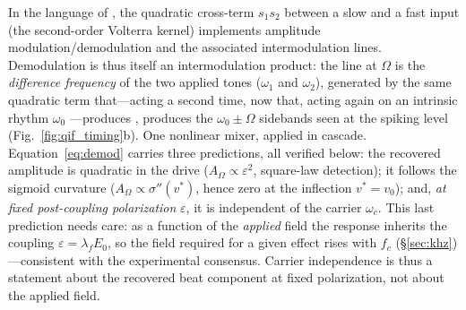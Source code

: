 \documentclass[11pt,a4paper]{article}
\newcommand{\Sig}{\sigma}
\providecommand{\DIFaddtex}[1]{{\protect\color{blue} \sf #1}} %
\providecommand{\DIFdeltex}[1]{{\protect\color{red} \scriptsize #1}} %
\providecommand{\DIFaddbegin}{} %
\providecommand{\DIFaddend}{} %
\providecommand{\DIFdelbegin}{} %
\providecommand{\DIFdelend}{} %
\providecommand{\DIFadd}[1]{\texorpdfstring{\DIFaddtex{#1}}{#1}} %
\providecommand{\DIFdel}[1]{\texorpdfstring{\DIFdeltex{#1}}{}} %
\begin{document}
In the language of \cite{ruffini2025ham}, the quadratic cross-term $s_1 s_2$ between a
slow and a fast input (the second-order Volterra kernel) implements amplitude
modulation/demodulation and the associated intermodulation lines.
Demodulation is thus itself an intermodulation product: the line at $\Omega$ is the
\emph{difference frequency} of the two applied tones ($\omega_1$ and $\omega_2$),
generated by the same quadratic term \DIFdelbegin \DIFdel{that---acting a second time, now }\DIFdelend \DIFaddbegin \DIFadd{that, acting again }\DIFaddend on an intrinsic
rhythm $\omega_0$\DIFdelbegin \DIFdel{---produces }\DIFdelend \DIFaddbegin \DIFadd{, produces }\DIFaddend the $\omega_0\pm\Omega$ sidebands seen at the spiking level
(Fig.~\ref{fig:qif_timing}b).
\DIFdelbegin \DIFdel{One nonlinear mixer, applied in cascade.
}\DIFdelend Equation~\eqref{eq:demod} carries three predictions, all verified below: the
recovered amplitude is quadratic in the drive ($A_\Omega\propto\varepsilon^2$,
square-law detection); it follows the sigmoid curvature
($A_\Omega\propto\Sig''(v^*)$, hence zero at the inflection $v^*=v_0$); and, \emph{at
fixed post-coupling polarization} $\varepsilon$, it is independent of the carrier
$\omega_c$. This last prediction needs care: as a function of the \emph{applied} field the
response inherits the coupling $\varepsilon=\lambda_f E_0$, so the field required for a
given effect rises with $f_c$ (\S\ref{sec:khz})---consistent with the experimental
consensus. Carrier independence is thus a statement about the recovered beat component at fixed
polarization, not about the applied field.
\end{document}
